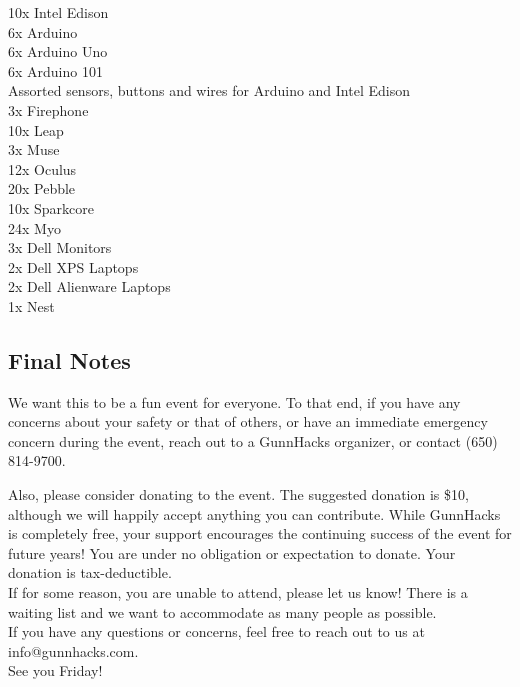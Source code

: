 \documentclass[12pt,onesided,letterpaper]{article}
\begin{document}
10x Intel Edison\\
6x Arduino\\
6x Arduino Uno\\
6x Arduino 101\\
Assorted sensors, buttons and wires for Arduino and Intel Edison\\
3x Firephone\\
10x Leap\\
3x Muse\\
12x Oculus\\
20x Pebble\\
10x Sparkcore\\
24x Myo\\
3x Dell Monitors\\
2x Dell XPS Laptops\\
2x Dell Alienware Laptops\\
1x Nest

\subsection*{Final Notes}

We want this to be a fun event for everyone. To that end, if you have any concerns about your safety or that of others, or have an immediate emergency concern during the event, reach out to a GunnHacks organizer, or contact (650) 814-9700.

Also, please consider donating to the event. The suggested donation is \$10, although we will happily accept anything you can contribute. While GunnHacks is completely free, your support encourages the continuing success of the event for future years! You are under no obligation or expectation to donate. Your donation is tax-deductible.\\

If for some reason, you are unable to attend, please let us know! There is a waiting list and we want to accommodate as many people as possible.\\

If you have any questions or concerns, feel free to reach out to us at info@gunnhacks.com.\\

See you Friday!
\end{document}
